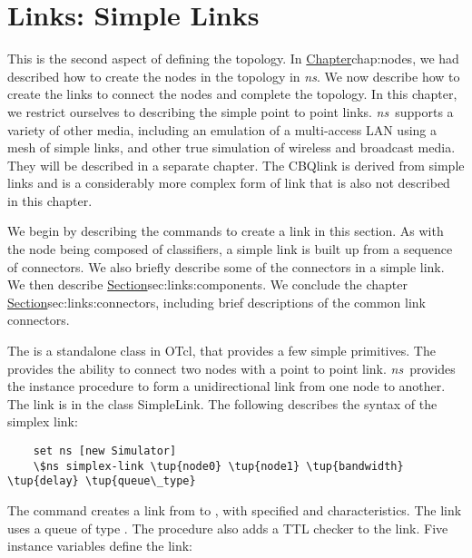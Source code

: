 \chapter{Links: Simple Links}
\label{chap:links}

This is the second aspect of defining the topology.
In \href{the previous chapter}{Chapter}{chap:nodes},
we had described how to create the nodes in the topology in \emph{ns}.
We now describe how to create the links to connect the nodes and complete
the topology.
In this chapter, we restrict ourselves to describing the simple
point to point links.
\emph{ns}\ supports a variety of other media, including
an emulation of a multi-access LAN using a mesh of simple links,
and other true simulation of wireless and broadcast media.
They will be described in a separate chapter.
The CBQlink is derived from simple links and is a considerably more
complex form of link that is also not described in this chapter.

We begin by describing the commands to create a link in this section.
As with the node being composed of classifiers, 
a simple link is built up from a sequence of connectors.
We also briefly describe some of the connectors in a simple link.
We then describe
\href{the instance procedures that operate on the various components of
defined by some of these connectors}{Section}{sec:links:components}.
We conclude the chapter
\href{with a description the connector object}{Section}{sec:links:connectors},
including brief
descriptions of the common link connectors.

The 
is a standalone class in OTcl,
that provides a few simple primitives.
The 
provides the ability to connect two nodes with a point to point link.
\emph{ns}\ provides the instance procedure
to form a unidirectional link from one node to another.
The link is in the class SimpleLink.
The following describes the syntax of the simplex link:
\begin{verbatim}
    set ns [new Simulator]
    \$ns simplex-link \tup{node0} \tup{node1} \tup{bandwidth} \tup{delay} \tup{queue\_type}
\end{verbatim}
The command creates a link from {\tt {}} to {\tt {}},
with specified {\tt {}} and {\tt {}} characteristics.
The link uses a queue of type {\tt {}}.
The procedure also adds a TTL checker to the link.
Five instance variables define the link:

